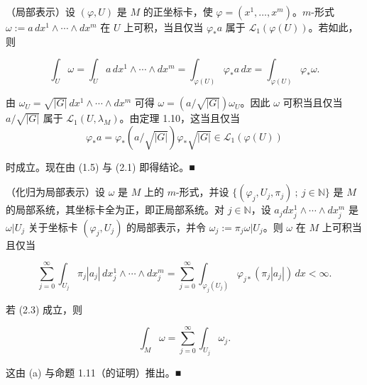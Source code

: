 \begin{remark}

\begin{items}
\item

（局部表示）设 $ (\varphi, U) $ 是 $ M $ 的正坐标卡，使 $ \varphi = (x^1, \ldots, x^m) $。$ m $-形式 $ \omega := a\,dx^1 \wedge \cdots \wedge dx^m $ 在 $ U $ 上可积，当且仅当 $ \varphi_* a $ 属于 $ \mathcal{L}_1(\varphi(U)) $。若如此，则

\begin{equation}
\int_U \omega = \int_U a\,dx^1 \wedge \cdots \wedge dx^m = \int_{\varphi(U)} \varphi_* a \, dx = \int_{\varphi(U)} \varphi_* \omega .\tag{2.2}
\end{equation}

\proofhead
由 $ \omega_U = \sqrt{|G|}\, dx^1 \wedge \cdots \wedge dx^m $ 可得 $ \omega = (a/\sqrt{|G|})\omega_U $。因此 $ \omega $ 可积当且仅当 $ a/\sqrt{|G|} $ 属于 $ \mathcal{L}_1(U, \lambda_M) $。由定理 1.10，这当且仅当
\[
\varphi_* a = \varphi_*(a/\sqrt{|G|}) \varphi_* \sqrt{|G|} \in \mathcal{L}_1(\varphi(U))
\]

时成立。现在由 (1.5) 与 (2.1) 即得结论。\nobreak\hspace{0.35em}■

\item

（化归为局部表示）设 $ \omega $ 是 $ M $ 上的 $ m $-形式，并设 $ \{(\varphi_j, U_j, \pi_j) \ ; \ j \in \mathbb{N}\} $ 是 $ M $ 的局部系统，其坐标卡全为正，即正局部系统。对 $ j \in \mathbb{N} $，设 $ a_j dx_j^1 \wedge \cdots \wedge dx_j^m $ 是 $ \omega|U_j $ 关于坐标卡 $ (\varphi_j, U_j) $ 的局部表示，并令 $ \omega_j := \pi_j \omega|U_j $。则 $ \omega $ 在 $ M $ 上可积当且仅当

\begin{equation}
\sum_{j=0}^{\infty} \int_{U_j} \pi_j |a_j|\, dx_j^1 \wedge \cdots \wedge dx_j^m = \sum_{j=0}^{\infty} \int_{\varphi_j(U_j)} \varphi_{j*}(\pi_j |a_j|)\, dx < \infty .\tag{2.3}
\end{equation}

若 (2.3) 成立，则

\begin{equation}
\int_M \omega = \sum_{j=0}^{\infty} \int_{U_j} \omega_j .\tag{2.4}
\end{equation}

\proofhead
这由 (a) 与命题 1.11（的证明）推出。\nobreak\hspace{0.35em}■
\item


\end{items}
\end{remark}
